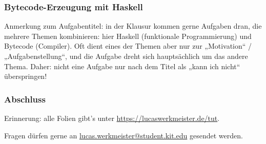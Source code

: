 \documentclass{beamer}
\begin{document}
\begin{frame}
  \frametitle{Bytecode-Erzeugung mit Haskell}
  Anmerkung zum Aufgabentitel:
  in der Klausur kommen gerne Aufgaben dran, die mehrere Themen kombinieren:
  hier Haskell (funktionale Programmierung) und Bytecode (Compiler).
  Oft dient eines der Themen aber nur zur „Motivation“ / „Aufgabenstellung“,
  und die Aufgabe dreht sich hauptsächlich um das andere Thema.
  Daher: nicht eine Aufgabe nur nach dem Titel als „kann ich nicht“ überspringen!
\end{frame}

\begin{frame}
  \frametitle{Abschluss}
  Erinnerung: alle Folien gibt’s unter \url{https://lucaswerkmeister.de/tut}.
  
  Fragen dürfen gerne an \href{mailto:lucas.werkmeister@student.kit.edu}{lucas.werkmeister@student.kit.edu} gesendet werden.
\end{frame}
\end{document}
